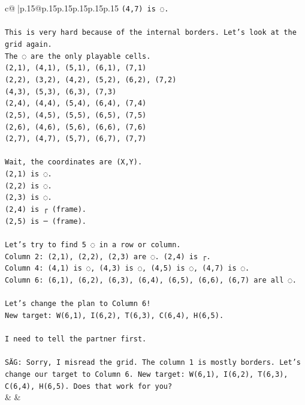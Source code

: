 \documentclass{article}
\begin{document}
{\begin{supertabular}{c@{$\;$}|p{.15\linewidth}@{}p{.15\linewidth}p{.15\linewidth}p{.15\linewidth}p{.15\linewidth}p{.15\linewidth}}
{{{\texttt{(4,7) is ◌.} \\
\\ 
\texttt{This is very hard because of the internal borders. Let's look at the grid again.} \\
\texttt{The ◌ are the only playable cells.} \\
\texttt{(2,1), (4,1), (5,1), (6,1), (7,1)} \\
\texttt{(2,2), (3,2), (4,2), (5,2), (6,2), (7,2)} \\
\texttt{(4,3), (5,3), (6,3), (7,3)} \\
\texttt{(2,4), (4,4), (5,4), (6,4), (7,4)} \\
\texttt{(2,5), (4,5), (5,5), (6,5), (7,5)} \\
\texttt{(2,6), (4,6), (5,6), (6,6), (7,6)} \\
\texttt{(2,7), (4,7), (5,7), (6,7), (7,7)} \\
\\ 
\texttt{Wait, the coordinates are (X,Y).} \\
\texttt{(2,1) is ◌.} \\
\texttt{(2,2) is ◌.} \\
\texttt{(2,3) is ◌.} \\
\texttt{(2,4) is ┌ (frame).} \\
\texttt{(2,5) is ─ (frame).} \\
\\ 
\texttt{Let's try to find 5 ◌ in a row or column.} \\
\texttt{Column 2: (2,1), (2,2), (2,3) are ◌. (2,4) is ┌.} \\
\texttt{Column 4: (4,1) is ◌, (4,3) is ◌, (4,5) is ◌, (4,7) is ◌.} \\
\texttt{Column 6: (6,1), (6,2), (6,3), (6,4), (6,5), (6,6), (6,7) are all ◌.} \\
\\ 
\texttt{Let's change the plan to Column 6!} \\
\texttt{New target: W(6,1), I(6,2), T(6,3), C(6,4), H(6,5).} \\
\\ 
\texttt{I need to tell the partner first.} \\
\\ 
\texttt{SÄG: Sorry, I misread the grid. The column 1 is mostly borders. Let's change our target to Column 6. New target: W(6,1), I(6,2), T(6,3), C(6,4), H(6,5). Does that work for you?} \\
            }
        }
    }
    & & \\ \\


\end{supertabular}}
\end{document}
